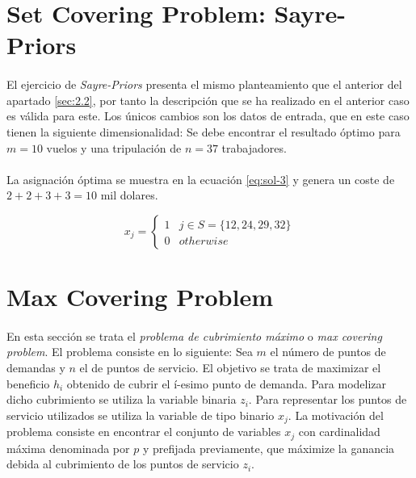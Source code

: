 \documentclass[spanish]{article}
\begin{document}
	\section{Set Covering Problem: Sayre-Priors}
	\label{sec:3}

		\paragraph{}
		El ejercicio de \emph{Sayre-Priors} presenta el mismo planteamiento que el anterior del apartado \ref{sec:2.2}, por tanto la descripción que se ha realizado en el anterior caso es válida para este. Los únicos cambios son los datos de entrada, que en este caso tienen la siguiente dimensionalidad: Se debe encontrar el resultado óptimo para $m = 10$ vuelos y una tripulación de $n = 37$ trabajadores.

		\paragraph{}
		La asignación óptima se muestra en la ecuación \eqref{eq:sol-3} y genera un coste de $2 + 2 + 3 + 3 = 10 $ mil dolares.

\begin{equation}
		\label{eq:sol-3}
			x_{j} =
				\begin{cases}
					1 & j \in S = \{ 12, 24, 29, 32  \} \\
					0 & otherwise
				\end{cases}
		\end{equation}


	\section{Max Covering Problem}
	\label{sec:4}

		\paragraph{}
		En esta sección se trata el \emph{problema de cubrimiento máximo} o \emph{max covering problem}. El problema consiste en lo siguiente: Sea $m$ el número de puntos de demandas y $n$ el de puntos de servicio. El objetivo se trata de maximizar el beneficio $h_i$ obtenido de cubrir el í-esimo punto de demanda. Para modelizar dicho cubrimiento se utiliza la variable binaria $z_i$. Para representar los puntos de servicio utilizados se utiliza la variable de tipo binario $x_j$. La motivación del problema consiste en encontrar el conjunto de variables $x_j$ con cardinalidad máxima denominada por $p$ y prefijada previamente, que máximize la ganancia debida al cubrimiento de los puntos de servicio $z_i$.
\end{document}
